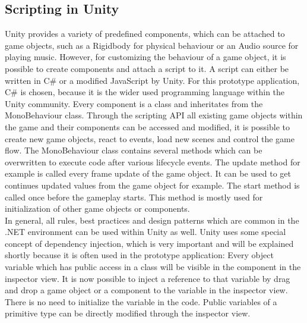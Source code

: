 \subsection{Scripting in Unity}
Unity provides a variety of predefined components, which can be attached to game objects, such as a Rigidbody for physical behaviour or an Audio source for playing music. However, for customizing the behaviour of a game object, it is possible to create components and attach a script to it. A script can either be written in C\# or a  modified JavaScript by Unity. For this prototype application, C\# is chosen, because it is the wider used programming language within the Unity community. Every component is a class and inheritates from the MonoBehaviour class. Through the scripting API all existing game objects within the game and their components can be accessed and modified, it is possible to create new game objects, react to events, load new scenes and control the game flow. The MonoBehaviour class contains several methods which can be overwritten to execute code after various lifecycle events. The update method for example is called every frame update of the game object. It can be used  to get continues updated values from the game object for example. The start method is called once before the gameplay starts. This method is mostly used for initialization of other game objects or components.\\
In general, all rules, best practices and design patterns which are common in the .NET environment can be used within Unity as well. Unity uses some special concept of dependency injection, which is very important and will be explained shortly because it is often used in the prototype application: Every object variable which has public access in a class will be visible in the component in the inspector view. It is now possible to inject a reference to that variable by drag and drop a game object or a component to the variable in the inspector view. There is no need to initialize the variable in the code. Public variables of a primitive type can  be directly modified through the inspector view.
